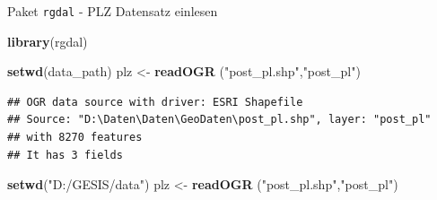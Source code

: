 \documentclass[ignorenonframetext,]{beamer}
\newenvironment{Shaded}{\begin{snugshade}}{\end{snugshade}}
\newcommand{\KeywordTok}[1]{\textcolor[rgb]{0.26,0.66,0.93}{\textbf{#1}}}
\newcommand{\StringTok}[1]{\textcolor[rgb]{0.02,0.61,0.04}{#1}}
\newcommand{\NormalTok}[1]{\textcolor[rgb]{0.74,0.68,0.62}{#1}}
\begin{document}
\begin{frame}[fragile]{Paket \texttt{rgdal} - PLZ Datensatz einlesen}

\begin{Shaded}
\begin{Highlighting}[]
\KeywordTok{library}\NormalTok{(rgdal)}
\end{Highlighting}
\end{Shaded}

\begin{Shaded}
\begin{Highlighting}[]
\KeywordTok{setwd}\NormalTok{(data_path)}
\NormalTok{plz <-}\StringTok{ }\KeywordTok{readOGR}\NormalTok{ (}\StringTok{"post_pl.shp"}\NormalTok{,}\StringTok{"post_pl"}\NormalTok{)}
\end{Highlighting}
\end{Shaded}

\begin{verbatim}
## OGR data source with driver: ESRI Shapefile 
## Source: "D:\Daten\Daten\GeoDaten\post_pl.shp", layer: "post_pl"
## with 8270 features
## It has 3 fields
\end{verbatim}

\begin{Shaded}
\begin{Highlighting}[]
\KeywordTok{setwd}\NormalTok{(}\StringTok{"D:/GESIS/data"}\NormalTok{)}
\NormalTok{plz <-}\StringTok{ }\KeywordTok{readOGR}\NormalTok{ (}\StringTok{"post_pl.shp"}\NormalTok{,}\StringTok{"post_pl"}\NormalTok{)}
\end{Highlighting}
\end{Shaded}

\end{frame}
\end{document}

